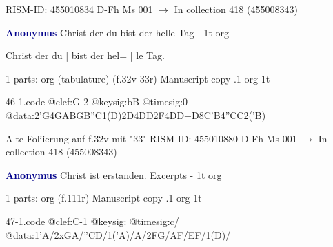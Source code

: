 \documentclass[twocolumn]{book}
\begin{document}
\newline RISM-ID: 455010834
\newline D-Fh  Ms 001
\newline $\rightarrow$ In collection 418 (455008343)
      
\newline \par \vspace{7pt} \textcolor{darkblue}{\textbf{Anonymus  }}
\newline Christ der du bist der helle Tag - 1t
\newline org
\newline \begin{itshape}[f.32v, at left:] Christ der du | bist der hel= | le Tag.\end{itshape} 
\newline \textcolor{darkblue}{}  1 parts: org (tabulature)  (f.32v-33r)
\newline Manuscript copy
.1  org  1t  
\begin{filecontents*}{46-1.code}
@clef:G-2
@keysig:bB
@timesig:0
@data:2'G4GABGB''C1(D)2D4DD2F4DD+D{8C'B}4''CC2('B)
\end{filecontents*}
\newline
%

\newline Alte Foliierung auf f.32v mit "33"
\newline RISM-ID: 455010880
\newline D-Fh  Ms 001
\newline $\rightarrow$ In collection 418 (455008343)
      
\newline \par \vspace{7pt} \textcolor{darkblue}{\textbf{Anonymus  }}
\newline Christ ist erstanden. Excerpts - 1t
\newline org
\newline \begin{itshape}\end{itshape} 
\newline \textcolor{darkblue}{}  1 parts: org  (f.111r)
\newline Manuscript copy
.1  org  1t
\newline \begin{footnotesize}  \end{footnotesize}  
\begin{filecontents*}{47-1.code}
@clef:C-1
@keysig:
@timesig:c/
@data:1'A/2xGA/''CD/1('A)/A/2FG/AF/EF/1(D)/
\end{filecontents*}
\newline
%
\end{document}
